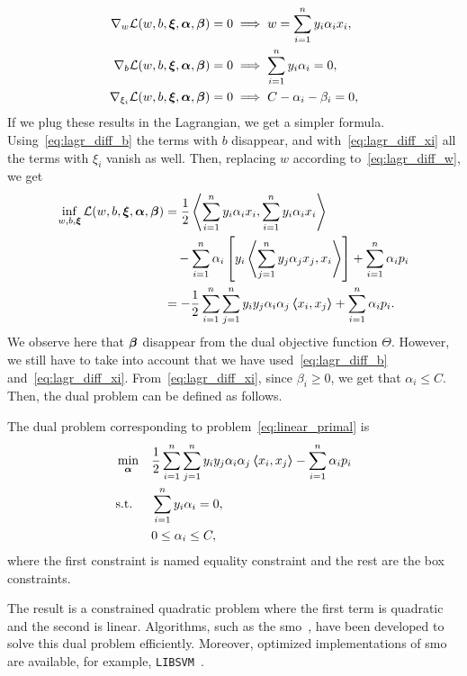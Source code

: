 \begin{align}
    \nabla_w \lagr(w, b, \fv{\xi}, \fv{\alpha}, \fv{\beta}) = 0 &\implies w = \sum_{i=1}^\nsamples y_i \alpha_i x_i , \label{eq:lagr_diff_w} \\
    \nabla_b \lagr(w, b, \fv{\xi}, \fv{\alpha}, \fv{\beta}) = 0 &\implies \sum_{i=1}^\nsamples y_i \alpha_i = 0, \label{eq:lagr_diff_b} \\
    \nabla_{\xi_i} \lagr(w, b, \fv{\xi}, \fv{\alpha}, \fv{\beta}) = 0 &\implies C - \alpha_i - \beta_i = 0 , \label{eq:lagr_diff_xi}
\end{align}
If we plug these results in the Lagrangian, we get a simpler formula. Using~\eqref{eq:lagr_diff_b} the terms with $b$ disappear, and with~\eqref{eq:lagr_diff_xi} all the terms with $\xi_i$ vanish as well. Then, replacing $w$ according to~\eqref{eq:lagr_diff_w}, we get 
\begin{equation}
    \nonumber
    \begin{aligned}
        \inf_{w, b, \bm{\xi}} \mathcal{L}(w, b, \bm{\xi}, \bm{\alpha}, \bm{\beta}) &= \frac{1}{2} \bm{\left\langle} \sum_{i=1}^n y_i \alpha_i x_i, \sum_{i=1}^n y_i \alpha_i x_i \bm{\right\rangle} \\
        &\quad- \sum_{i=1}^n \alpha_i \left[y_i \bm{\left\langle} \sum_{j=1}^n y_j \alpha_j x_j, x_i \bm{\right\rangle}  \right] + \sum_{i=1}^n \alpha_i p_i \\
        &= -\frac{1}{2} \sum_{i=1}^n \sum_{j=1}^n y_i y_j \alpha_i \alpha_j \bm{\left\langle} x_i, x_j \bm{\right\rangle} + \sum_{i=1}^n \alpha_i p_i .
    \end{aligned}
\end{equation}
We observe here that $\bm{\beta}$ disappear from the dual objective function $\Theta$. However, we still have to take into account that we have used~\eqref{eq:lagr_diff_b} and~\eqref{eq:lagr_diff_xi}. From~\eqref{eq:lagr_diff_xi}, since $\beta_i \geq 0$, we get that $\alpha_i \leq C$. Then, the dual problem can be defined as follows.
\begin{definition}
    The dual problem corresponding to problem~\eqref{eq:linear_primal} is
    \begin{equation}
        \label{eq:linear_dual}
        \begin{aligned}
            &\min_{\fv{\alpha}} & & \frac{1}{2} \sum_{i=1}^\nsamples \sum_{j=1}^\nsamples y_i y_j \alpha_i \alpha_j \dotp{x_i}{x_j} - \sum_{i=1}^\nsamples \alpha_i p_i \\
            & \text{s.t.} & & \sum_{i=1}^\nsamples y_i \alpha_i = 0 , \\
            & & & 0 \leq \alpha_i \leq C ,      
        \end{aligned}  
    \end{equation}
    where the first constraint is named equality constraint and the rest are the box constraints.
\end{definition}
The result is a constrained quadratic problem where the first term is quadratic and the second is linear. Algorithms, such as the \acrfull{smo}~\citep{KeerthiSBM01}, have been developed to solve this dual problem efficiently. Moreover, optimized implementations of \acrshort{smo} are available, for example, \texttt{LIBSVM}~\citep{ChangL11}.

